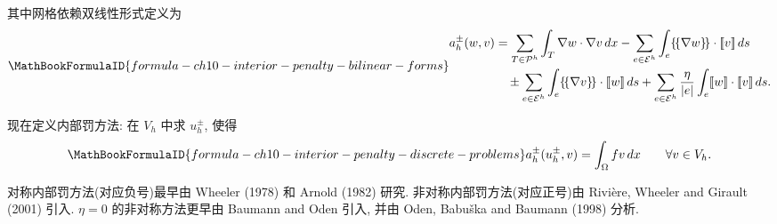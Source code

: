 其中网格依赖双线性形式定义为
\begin{equation}
\MathBookFormulaID{formula-ch10-interior-penalty-bilinear-forms}
\label{eq:ch10-interior-penalty-bilinear-forms}
\begin{split}
a_h^\pm(w,v)
&=\sum_{T\in\mathcal P^h}\int_T\nabla w\cdot\nabla v\,dx
-\sum_{e\in\mathcal E^h}\int_e\{\!\{\nabla w\}\!\}\cdot[\![v]\!]\,ds\\
&\quad\mathbin{\pm}\sum_{e\in\mathcal E^h}\int_e
\{\!\{\nabla v\}\!\}\cdot[\![w]\!]\,ds
+\sum_{e\in\mathcal E^h}\frac\eta{|e|}\int_e[\![w]\!]\cdot[\![v]\!]\,ds.
\end{split}
\end{equation}

现在定义内部罚方法: 在 $V_h$ 中求 $u_h^\pm$, 使得
\begin{equation}
\MathBookFormulaID{formula-ch10-interior-penalty-discrete-problems}
\label{eq:ch10-interior-penalty-discrete-problems}
a_h^\pm(u_h^\pm,v)=\int_\Omega fv\,dx
\qquad\forall v\in V_h.
\end{equation}

\begin{Remark}
\label{rem:ch10-interior-penalty-history}
对称内部罚方法(对应负号)最早由 Wheeler (1978) 和 Arnold (1982) 研究. 非对称内部罚方法(对应正号)由 Rivière, Wheeler and Girault (2001) 引入. $\eta=0$ 的非对称方法更早由 Baumann and Oden 引入, 并由 Oden, Babuška and Baumann (1998) 分析.
\end{Remark}

